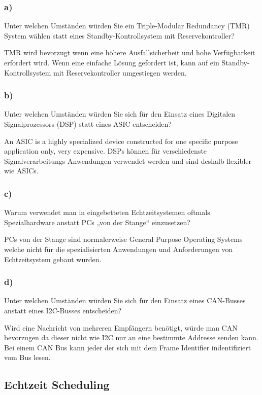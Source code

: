 \subsubsection{a)}
Unter welchen Umständen würden Sie ein Triple-Modular Redundancy (TMR) System wählen statt
eines Standby-Kontrollsystem mit Reservekontroller?

TMR wird bevorzugt wenn eine höhere Ausfallsicherheit und hohe Verfügbarkeit erfordert wird.
Wenn eine einfache Lösung gefordert ist, kann auf ein Standby-Kontrollsystem mit Reservekontroller
umgestiegen werden.

\subsubsection{b)}
Unter welchen Umständen würden Sie sich für den Einsatz eines Digitalen Signalprozessors (DSP) statt
eines ASIC entscheiden?

An ASIC is a highly specialized device constructed for one specific purpose application only, very expensive.
DSPs können für verschiedenste Signalverarbeitungs Anwendungen verwendet werden und sind deshalb flexibler wie ASICs.

\subsubsection{c)}
Warum verwendet man in eingebetteten Echtzeitsystemen oftmals Spezialhardware anstatt PCs „von
der Stange“ einzusetzen?

PCs von der Stange sind normalerweise General Purpose Operating Systems welche nicht für die spezialisierten Anwendungen
und Anforderungen von Echtzeitsystem gebaut wurden. 

\subsubsection{d)}
Unter welchen Umständen würden Sie sich für den Einsatz eines CAN-Busses anstatt eines I2C-Busses
entscheiden?

Wird eine Nachricht von mehreren Empfängern benötigt, würde man CAN bevorzugen da dieser nicht wie I2C nur an eine 
bestimmte Addresse senden kann. Bei einem CAN Bus kann jeder der sich mit dem Frame Identifier indentifiziert vom Bus lesen.

\subsection{Echtzeit Scheduling}
